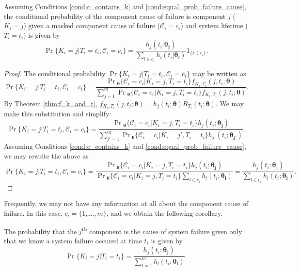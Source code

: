 \documentclass[
]{article}
\begin{document}
\begin{theorem}
Assuming Conditions \ref{cond:c_contains_k} and \ref{cond:equal_prob_failure_cause},
the conditional probability of the component cause of failure is component $j$ ($K_i = j$) given a masked component cause of failure ($\mathcal{C}_i = c_i$) and system lifetime ($T_i = t_i$)
is given by
\begin{equation}
\label{eq:cond_prob_k_given_t_and_c}
\Pr\{K_i = j|T_i=t_i,\mathcal{C}_i=c_i\} =
 \frac{h_j(t_i|\boldsymbol{\theta_j})}{\sum_{l \in c_i} h_l(t_i|\boldsymbol{\theta_l})} 1_{\{j \in c_i\}}.
\end{equation}
\end{theorem}
\begin{proof}
The conditional probability $\Pr\{K_i = j|T_i=t_i,\mathcal{C}_i=c_i\}$ may be
written as
$$
\Pr\{K_i = j|T_i=t_i,\mathcal{C}_i=c_i\} =
    \frac{\Pr{}_{\!\boldsymbol{\theta}}\{\mathcal{C}_i=c_i|K_i = j,T_i=t_i\} f_{K_i,T_i}(j,t_i;\boldsymbol{\theta})}
    {\sum_{j=1}^m \Pr{}_{\!\boldsymbol{\theta}}
        \{\mathcal{C}_i=c_i|K_i = j,T_i=t_i\} f_{K_i,T_i}(j,t_i;\boldsymbol{\theta})}.
$$
By Theorem \ref{thm:f_k_and_t},
$f_{K_i,T_i}(j,t_i;\boldsymbol{\theta}) = h_j(t_i;\boldsymbol{\theta})R_{T_i}(t_i;\boldsymbol{\theta})$.
We may make this substitution and simplify:
$$
\Pr\{K_i = j|T_i=t_i,\mathcal{C}_i=c_i\} =
    \frac{\Pr{}_{\!\boldsymbol{\theta}}\{\mathcal{C}_i=c_i|K_i = j,T_i=t_i\} h_j(t_i;\boldsymbol{\theta_j})}
         {\sum_{j'=1}^m \Pr{}_{\!\boldsymbol{\theta}}\{\mathcal{C}_i=c_i|K_i=j',T_i=t_i\} h_{j'}(t_i;\boldsymbol{\theta_{j'}})}.
$$
Assuming Conditions \ref{cond:c_contains_k} and \ref{cond:equal_prob_failure_cause}, we may rewrite the above
as
$$
\Pr\{K_i = j|T_i=t_i,\mathcal{C}_i=c_i\} =
    \frac{\Pr{}_{\!\boldsymbol{\theta}}\{\mathcal{C}_i=c_i|K_i = j,T_i=t_i\} h_j(t_i;\boldsymbol{\theta_j})}
    {\Pr{}_{\!\boldsymbol{\theta}}\{\mathcal{C}_i=c_i|K_i = j,T_i=t_i\} {\sum_{l \in c_i} h_l(t_i;\boldsymbol{\theta_l})}} =
    \frac{h_j(t_i;\boldsymbol{\theta_j})}
    {\sum_{l \in c_i} h_l(t_i;\boldsymbol{\theta_l})}.
$$
\end{proof}

Frequently, we may not have any information at all about the component
cause of failure. In this case, \(c_i = \{1,\ldots,m\}\), and we obtain
the following corollary.

\begin{corollary}
The probability that the $j$\textsuperscript{th}
component is the cause of system failure given only that we know a system failure
occured at time $t_i$ is given by
$$
\Pr\{K_i = j|T_i=t_i\} = \frac{h_j(t_i;\boldsymbol{\theta_j})}{\sum_{l=1}^m h_l(t_i;\boldsymbol{\theta_l})}.
$$
\end{corollary}

  
\end{document}
